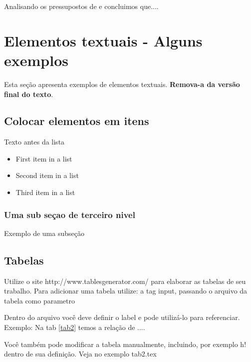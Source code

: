\documentclass[	DIV=calc,%
							paper=a4,%
							fontsize=12pt,%
							onecolumn]{scrartcl}	 					%
\begin{document}
Analisando os pressupostos de \cite{ref3} e \cite{ref4} concluimos que....


\renewcommand\refname{} %

  


\section{Elementos textuais - Alguns exemplos}

Esta seção apresenta exemplos de elementos textuais. \textbf{Remova-a da versão final do texto}.


\subsection{Colocar elementos em itens}

Texto antes da lista

\begin{itemize}
	\item First item in a list 
	\item Second item in a list 
	\item Third item in a list
\end{itemize}

\subsubsection{Uma sub seçao de terceiro nivel}

Exemplo de uma subseção

\subsection{Tabelas}

Utilize o site http://www.tablesgenerator.com/ para elaborar as tabelas de seu trabalho.
Para adicionar uma tabela utilize: a tag input, passando o arquivo da tabela como parametro



Dentro do arquivo você deve definir o label e pode utilizá-lo para referenciar. Exemplo:
Na tab \ref{tab2} temos a relação de ....


Você também pode modificar a tabela manualmente, incluindo, por exemplo h! dentro de sua definição. Veja no exemplo tab2.tex
\end{document}
